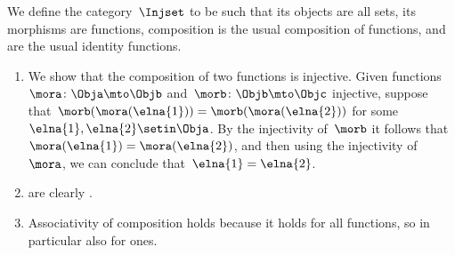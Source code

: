 \begin{solution}
    We define the category~$\Injset$ to be such that its objects are all sets, its morphisms are  functions, composition is the usual composition of functions, and  are the usual identity functions.
    \begin{enumerate}
        \item We show that the composition of two  functions is injective.
              Given functions~$\mora \colon \Obja \mto \Objb$ and~$\morb \colon \Objb \mto \Objc$ injective, suppose that~$\morb(\mora (\elna{1})) = \morb(\mora (\elna{2}))$ for some~$\elna{1}, \elna{2} \setin \Obja$.
              By the injectivity of~$\morb$ it follows that~$\mora (\elna{1}) = \mora (\elna{2})$, and then using the injectivity of~$\mora$, we can conclude that~$\elna{1} = \elna{2}$.
        \item {} are clearly .
        \item Associativity of composition holds because it holds for all functions, so in particular also for  ones.
    \end{enumerate}
\end{solution}


